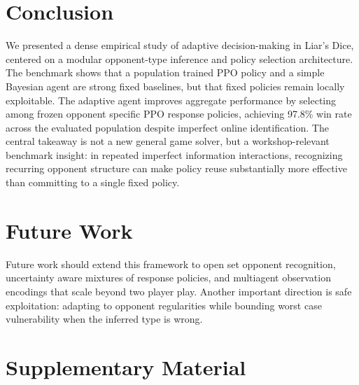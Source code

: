 \documentclass[letterpaper]{article} %
\begin{document}
\section{Conclusion}
We presented a dense empirical study of adaptive decision-making in Liar's Dice, centered on a modular opponent-type inference and policy selection architecture. The benchmark shows that a population trained PPO policy and a simple Bayesian agent are strong fixed baselines, but that fixed policies remain locally exploitable. The adaptive agent improves aggregate performance by selecting among frozen opponent specific PPO response policies, achieving 97.8\% win rate across the evaluated population despite imperfect online identification. The central takeaway is not a new general game solver, but a workshop-relevant benchmark insight: in repeated imperfect information interactions, recognizing recurring opponent structure can make policy reuse substantially more effective than committing to a single fixed policy.

\section{Future Work}
Future work should extend this framework to open set opponent recognition, uncertainty aware mixtures of response policies, and multiagent observation encodings that scale beyond two player play. Another important direction is safe exploitation: adapting to opponent regularities while bounding worst case vulnerability when the inferred type is wrong.

\clearpage



\clearpage
\section*{Supplementary Material}

\end{document}
